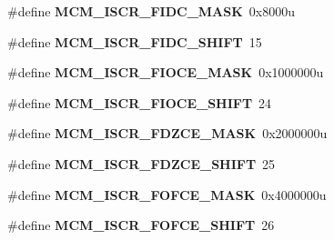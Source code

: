 \begin{DoxyCompactItemize}
\item 
\#define {\bfseries M\+C\+M\+\_\+\+I\+S\+C\+R\+\_\+\+F\+I\+D\+C\+\_\+\+M\+A\+SK}~0x8000u\hypertarget{group__MCM__Register__Masks_gaeca36bf639a606a24f7ee6a4fc983528}{}\label{group__MCM__Register__Masks_gaeca36bf639a606a24f7ee6a4fc983528}

\item 
\#define {\bfseries M\+C\+M\+\_\+\+I\+S\+C\+R\+\_\+\+F\+I\+D\+C\+\_\+\+S\+H\+I\+FT}~15\hypertarget{group__MCM__Register__Masks_gaaf16fcce0e380e7f200d910008794028}{}\label{group__MCM__Register__Masks_gaaf16fcce0e380e7f200d910008794028}

\item 
\#define {\bfseries M\+C\+M\+\_\+\+I\+S\+C\+R\+\_\+\+F\+I\+O\+C\+E\+\_\+\+M\+A\+SK}~0x1000000u\hypertarget{group__MCM__Register__Masks_gaf48976f7ac1761a6145eea9a6add5ff5}{}\label{group__MCM__Register__Masks_gaf48976f7ac1761a6145eea9a6add5ff5}

\item 
\#define {\bfseries M\+C\+M\+\_\+\+I\+S\+C\+R\+\_\+\+F\+I\+O\+C\+E\+\_\+\+S\+H\+I\+FT}~24\hypertarget{group__MCM__Register__Masks_ga97f10ab969b7c83eb9cde216807b215b}{}\label{group__MCM__Register__Masks_ga97f10ab969b7c83eb9cde216807b215b}

\item 
\#define {\bfseries M\+C\+M\+\_\+\+I\+S\+C\+R\+\_\+\+F\+D\+Z\+C\+E\+\_\+\+M\+A\+SK}~0x2000000u\hypertarget{group__MCM__Register__Masks_ga2ad0b7495aba7dacde7658c2a71db6bd}{}\label{group__MCM__Register__Masks_ga2ad0b7495aba7dacde7658c2a71db6bd}

\item 
\#define {\bfseries M\+C\+M\+\_\+\+I\+S\+C\+R\+\_\+\+F\+D\+Z\+C\+E\+\_\+\+S\+H\+I\+FT}~25\hypertarget{group__MCM__Register__Masks_ga12ce128ef5d64154df362b12c33aa526}{}\label{group__MCM__Register__Masks_ga12ce128ef5d64154df362b12c33aa526}

\item 
\#define {\bfseries M\+C\+M\+\_\+\+I\+S\+C\+R\+\_\+\+F\+O\+F\+C\+E\+\_\+\+M\+A\+SK}~0x4000000u\hypertarget{group__MCM__Register__Masks_ga7c59e8eefce78e605951ecf8c9da1f00}{}\label{group__MCM__Register__Masks_ga7c59e8eefce78e605951ecf8c9da1f00}

\item 
\#define {\bfseries M\+C\+M\+\_\+\+I\+S\+C\+R\+\_\+\+F\+O\+F\+C\+E\+\_\+\+S\+H\+I\+FT}~26\hypertarget{group__MCM__Register__Masks_gab83f7a7d4986544ad6d5a3972d72ced3}{}\label{group__MCM__Register__Masks_gab83f7a7d4986544ad6d5a3972d72ced3}


\end{DoxyCompactItemize}
